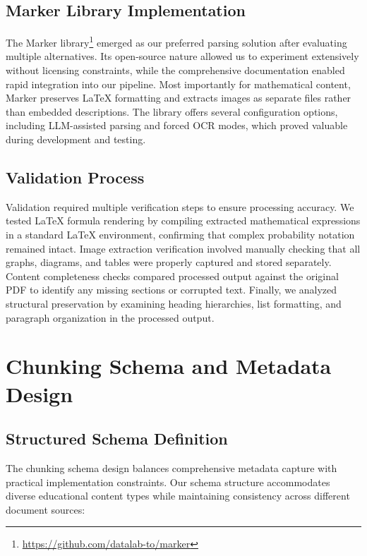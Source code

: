\documentclass[12pt]{article}
\begin{document}
\subsection{Marker Library Implementation}

The Marker library\footnote{\url{https://github.com/datalab-to/marker}} emerged as our preferred parsing solution after evaluating multiple alternatives. Its open-source nature allowed us to experiment extensively without licensing constraints, while the comprehensive documentation enabled rapid integration into our pipeline. Most importantly for mathematical content, Marker preserves LaTeX formatting and extracts images as separate files rather than embedded descriptions. The library offers several configuration options, including LLM-assisted parsing and forced OCR modes, which proved valuable during development and testing.

\subsection{Validation Process}

Validation required multiple verification steps to ensure processing accuracy. We tested LaTeX formula rendering by compiling extracted mathematical expressions in a standard LaTeX environment, confirming that complex probability notation remained intact. Image extraction verification involved manually checking that all graphs, diagrams, and tables were properly captured and stored separately. Content completeness checks compared processed output against the original PDF to identify any missing sections or corrupted text. Finally, we analyzed structural preservation by examining heading hierarchies, list formatting, and paragraph organization in the processed output.

\section{Chunking Schema and Metadata Design}

\subsection{Structured Schema Definition}

The chunking schema design balances comprehensive metadata capture with practical implementation constraints. Our schema structure accommodates diverse educational content types while maintaining consistency across different document sources:
\end{document}
